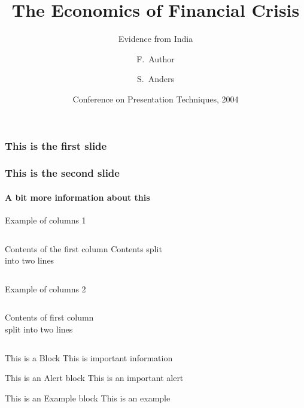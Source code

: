 \documentclass{beamer}
\title[Crisis] %
      {The Economics of Financial Crisis}
\subtitle{Evidence from India}
\author[Author, Anders] %
             {F.~Author\inst{1} \and S.~Anders\inst{2}}
\institute[Universities Here and There] %
                       {
                         \inst{1}%
                         Institute of Computer Science\\
                         University Here
                         \and
                         \inst{2}%
                         Institute of Theoretical Philosophy\\
                         University There
                       }
\date[KPT 2004] %
                            {Conference on Presentation Techniques, 2004}
\begin{document}
                            
\frame{\titlepage}


\begin{frame}
  \frametitle{This is the first slide}
\end{frame}
\begin{frame}
  \frametitle{This is the second slide}
  \framesubtitle{A bit more information about this}
\end{frame}


\begin{frame}{Example of columns 1}
  \begin{columns}[c] %
    Contents of the first column
    Contents split \\ into two lines
  \end{columns}
\end{frame}

\begin{frame}{Example of columns 2}
  \begin{columns}[T] %
    \begin{column}[T]{5cm} %
      Contents of first column \\ split into two lines
    \end{column}
    \begin{column}[T]{5cm} %
      
    \end{column}
  \end{columns}
  \end{frame}

\begin{frame}

  \begin{block}{This is a Block}
    This is important information
  \end{block}

  \begin{alertblock}{This is an Alert block}
    This is an important alert
  \end{alertblock}

  \begin{exampleblock}{This is an Example block}
    This is an example
  \end{exampleblock}

  \end{frame}
\end{document}
